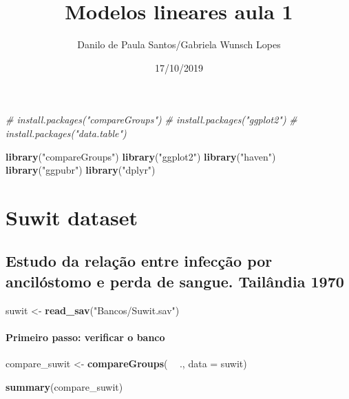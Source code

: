 \documentclass[]{article}
\title{Modelos lineares aula 1}
\author{Danilo de Paula Santos/Gabriela Wunsch Lopes}
\date{17/10/2019}
\newenvironment{Shaded}{\begin{snugshade}}{\end{snugshade}}
\newcommand{\CommentTok}[1]{\textcolor[rgb]{0.56,0.35,0.01}{\textit{#1}}}
\newcommand{\DataTypeTok}[1]{\textcolor[rgb]{0.13,0.29,0.53}{#1}}
\newcommand{\KeywordTok}[1]{\textcolor[rgb]{0.13,0.29,0.53}{\textbf{#1}}}
\newcommand{\NormalTok}[1]{#1}
\newcommand{\OperatorTok}[1]{\textcolor[rgb]{0.81,0.36,0.00}{\textbf{#1}}}
\newcommand{\StringTok}[1]{\textcolor[rgb]{0.31,0.60,0.02}{#1}}
\let\oldparagraph\paragraph
\renewcommand{\paragraph}[1]{\oldparagraph{#1}\mbox{}}
\begin{document}
\maketitle

\begin{Shaded}
\begin{Highlighting}[]
\CommentTok{# install.packages("compareGroups")}
\CommentTok{# install.packages("ggplot2")}
\CommentTok{# install.packages("data.table")}


\KeywordTok{library}\NormalTok{(}\StringTok{"compareGroups"}\NormalTok{)}
\KeywordTok{library}\NormalTok{(}\StringTok{"ggplot2"}\NormalTok{)}
\KeywordTok{library}\NormalTok{(}\StringTok{"haven"}\NormalTok{)}
\KeywordTok{library}\NormalTok{(}\StringTok{"ggpubr"}\NormalTok{)}
\KeywordTok{library}\NormalTok{(}\StringTok{"dplyr"}\NormalTok{)}
\end{Highlighting}
\end{Shaded}

\hypertarget{suwit-dataset}{%
\section{Suwit dataset}\label{suwit-dataset}}

\hypertarget{estudo-da-relacao-entre-infeccao-por-ancilostomo-e-perda-de-sangue.-tailandia-1970}{%
\subsection{Estudo da relação entre infecção por ancilóstomo e perda de
sangue. Tailândia
1970}\label{estudo-da-relacao-entre-infeccao-por-ancilostomo-e-perda-de-sangue.-tailandia-1970}}

\begin{Shaded}
\begin{Highlighting}[]
\NormalTok{suwit <-}\StringTok{ }\KeywordTok{read_sav}\NormalTok{(}\StringTok{"Bancos/Suwit.sav"}\NormalTok{)}
\end{Highlighting}
\end{Shaded}

\hypertarget{primeiro-passo-verificar-o-banco}{%
\paragraph{Primeiro passo: verificar o
banco}\label{primeiro-passo-verificar-o-banco}}

\begin{Shaded}
\begin{Highlighting}[]
\NormalTok{compare_suwit <-}\StringTok{ }\KeywordTok{compareGroups}\NormalTok{( }\OperatorTok{~}\StringTok{ }\NormalTok{., }\DataTypeTok{data =}\NormalTok{ suwit)}

\KeywordTok{summary}\NormalTok{(compare_suwit)}
\end{Highlighting}
\end{Shaded}
\end{document}

